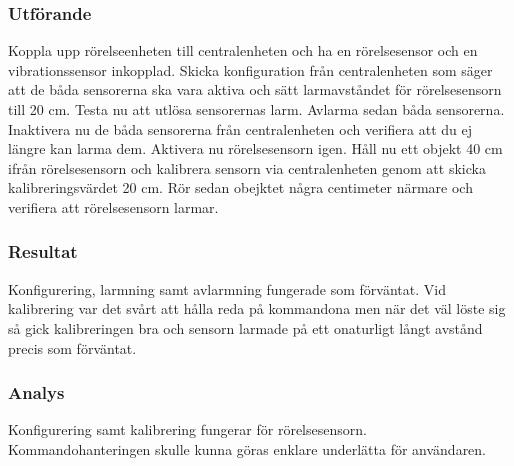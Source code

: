 \subsubsection*{Utförande}
Koppla upp rörelseenheten till centralenheten och ha en rörelsesensor och en vibrationssensor inkopplad. Skicka konfiguration från centralenheten som säger att de båda sensorerna ska vara aktiva och sätt larmavståndet för rörelsesensorn till 20 cm. Testa nu att utlösa sensorernas larm. Avlarma sedan båda sensorerna. Inaktivera nu de båda sensorerna från centralenheten och verifiera att du ej längre kan larma dem. Aktivera nu rörelsesensorn igen. 
Håll nu ett objekt 40 cm ifrån rörelsesensorn och kalibrera sensorn via centralenheten genom att skicka kalibreringsvärdet 20 cm. Rör sedan obejktet några centimeter närmare och verifiera att rörelsesensorn larmar.


\subsubsection*{Resultat}
Konfigurering, larmning samt avlarmning fungerade som förväntat. Vid kalibrering var det svårt att hålla reda på kommandona men när det väl löste sig så gick kalibreringen bra och sensorn larmade på ett onaturligt långt avstånd precis som förväntat.



\subsubsection*{Analys}
Konfigurering samt kalibrering fungerar för rörelsesensorn. Kommandohanteringen skulle kunna göras enklare underlätta för användaren.


